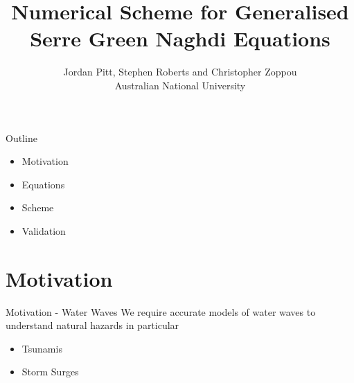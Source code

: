 \documentclass[pdf]{beamer}
\title{Numerical Scheme for Generalised Serre Green Naghdi Equations}
\author{Jordan Pitt, Stephen Roberts and Christopher Zoppou \\ Australian National University}
\begin{document}
\begin{frame}
	\titlepage
\end{frame}


\begin{frame}{Outline}
	\begin{itemize}
		\item Motivation
		\item Equations
		\item Scheme
		\item Validation
	\end{itemize}
\end{frame}
\section{Motivation}
\begin{frame}{Motivation - Water Waves}
We require accurate models of water waves to understand natural hazards in particular
	\begin{itemize}
		\item Tsunamis
		\item Storm Surges
	\end{itemize}
\end{frame}
\end{document}
